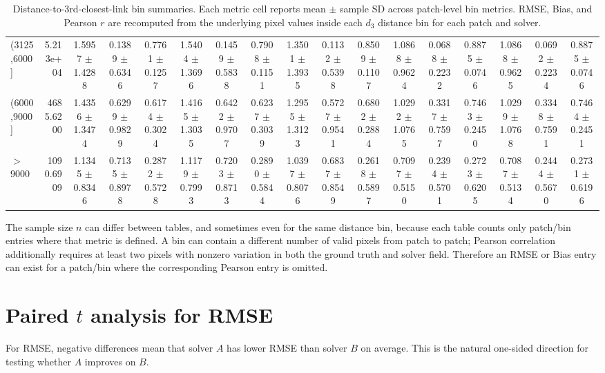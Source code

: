 \documentclass[11pt]{article}
\begin{document}
\begin{table}[H]
{\begin{tabular}{lrccccccccccccccc}
\mbox{(3125,6000]} & 5.213e+04 & 1.5957 $\pm$ 1.4288 & 0.1389 $\pm$ 0.6346 & 0.7761 $\pm$ 0.1257 & 1.5404 $\pm$ 1.3696 & 0.1459 $\pm$ 0.5838 & 0.7908 $\pm$ 0.1151 & 1.3501 $\pm$ 1.3935 & 0.1132 $\pm$ 0.5398 & 0.8509 $\pm$ 0.1107 & 1.0868 $\pm$ 0.9624 & 0.0688 $\pm$ 0.2232 & 0.8875 $\pm$ 0.0746 & 1.0868 $\pm$ 0.9625 & 0.0692 $\pm$ 0.2234 & 0.8875 $\pm$ 0.0746 \\
\mbox{(6000,9000]} & 4685.6200 & 1.4356 $\pm$ 1.3474 & 0.6299 $\pm$ 0.9829 & 0.6174 $\pm$ 0.3024 & 1.4165 $\pm$ 1.3035 & 0.6422 $\pm$ 0.9707 & 0.6237 $\pm$ 0.3039 & 1.2955 $\pm$ 1.3123 & 0.5727 $\pm$ 0.9541 & 0.6802 $\pm$ 0.2884 & 1.0292 $\pm$ 1.0765 & 0.3317 $\pm$ 0.7597 & 0.7463 $\pm$ 0.2450 & 1.0299 $\pm$ 1.0768 & 0.3348 $\pm$ 0.7591 & 0.7464 $\pm$ 0.2451 \\
\mbox{$>$9000} & 1090.6909 & 1.1345 $\pm$ 0.8346 & 0.7135 $\pm$ 0.8978 & 0.2872 $\pm$ 0.5728 & 1.1179 $\pm$ 0.7993 & 0.7203 $\pm$ 0.8713 & 0.2890 $\pm$ 0.5844 & 1.0397 $\pm$ 0.8076 & 0.6837 $\pm$ 0.8549 & 0.2618 $\pm$ 0.5897 & 0.7097 $\pm$ 0.5150 & 0.2394 $\pm$ 0.5701 & 0.2723 $\pm$ 0.6205 & 0.7087 $\pm$ 0.5134 & 0.2444 $\pm$ 0.5670 & 0.2731 $\pm$ 0.6196 \\
\bottomrule
\end{tabular}%
}
\caption{Distance-to-3rd-closest-link bin summaries. Each metric cell reports mean $\pm$ sample SD across patch-level bin metrics. RMSE, Bias, and Pearson $r$ are recomputed from the underlying pixel values inside each $d_3$ distance bin for each patch and solver.}
\end{table}

The sample size $n$ can differ between tables, and sometimes even for the same distance bin, because each table counts only patch/bin entries where that metric is defined. A bin can contain a different number of valid pixels from patch to patch; Pearson correlation additionally requires at least two pixels with nonzero variation in both the ground truth and solver field. Therefore an RMSE or Bias entry can exist for a patch/bin where the corresponding Pearson entry is omitted.

\section*{Paired $t$ analysis for RMSE}
For RMSE, negative differences mean that solver $A$ has lower RMSE than solver $B$ on average. This is the natural one-sided direction for testing whether $A$ improves on $B$.
\end{document}

